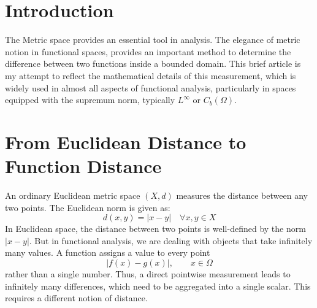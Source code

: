 \documentclass{article}
\begin{document}
\maketitle

\section{Introduction}
The Metric space provides an essential tool in analysis. The elegance of metric notion in functional spaces, provides an important method to determine the difference between two functions inside a bounded domain. This brief article is my attempt to reflect the mathematical details of this measurement, which is widely used in almost all aspects of functional analysis, particularly in spaces equipped with the supremum norm, typically $L^\infty$ or $C_b(\Omega)$. 
\section{From Euclidean Distance to Function Distance} An ordinary Euclidean metric space $(X, d)$ measures the distance between any two points. The Euclidean norm is given as:
\[
d(x,y)=|x-y| \quad \forall x,y\in X
\]
In Euclidean space, the distance between two points is well-defined by the norm $|x-y|$. But in functional analysis, we are dealing with objects that take infinitely many values. A function assigns a value to every point
\[
|f(x)-g(x)|,
\qquad x\in\Omega
\]
rather than a single number.
Thus, a direct pointwise measurement leads to infinitely many differences, which need to be aggregated into a single scalar. This requires a different notion of distance.
\end{document}
